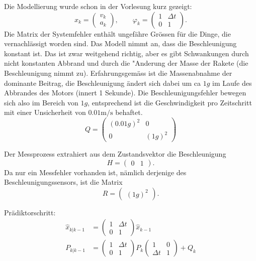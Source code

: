 \begin{loesung}
\begin{teilaufgaben}
\item Die Modellierung wurde schon in der Vorlesung kurz gezeigt:
\[
x_k=\begin{pmatrix}v_k\\a_k\end{pmatrix},\qquad
\varphi_k=\begin{pmatrix}1&\Delta t\\0&1\end{pmatrix}.
\]
Die Matrix der Systemfehler enthält ungefähre Grössen für die Dinge,
die vernachlässigt worden sind. Das Modell nimmt an, dass die
Beschleunigung konstant ist.
Das ist zwar weitgehend richtig, aber es gibt Schwankungen durch
nicht konstanten Abbrand und durch die "Anderung der Masse der
Rakete (die Beschleunigung nimmt zu). Erfahrungsgemäss ist die
Massenabnahme der dominante Beitrag, die Beschleunigung ändert sich
dabei um ca $1g$ im Laufe des Abbrandes des Motors (innert 1 Sekunde).
Die Beschleunigungsfehler bewegen sich also im Bereich von $1g$, entsprechend
ist die Geschwindigkeit pro Zeitschritt mit einer Unsicherheit von
$0.01\text{m/s}$ behaftet.
\[
Q=\begin{pmatrix}
(0.01g)^2&0\\
0&(1g)^2
\end{pmatrix}
\]
\item
Der Messprozess extrahiert aus dem Zustandsvektor die Beschleunigung
\[
H=\begin{pmatrix}0&1\end{pmatrix}.
\]
Da nur ein Messfehler vorhanden ist, nämlich derjenige des
Beschleunigungssensors, ist die Matrix
\[
R=\begin{pmatrix}
(1g)^2
\end{pmatrix}.
\]
\item Prädiktorschritt:
\begin{align*}
\hat x_{k|k-1}&=
\begin{pmatrix}1&\Delta t\\0&1\end{pmatrix}
\hat x_{k-1}
\\
P_{k|k-1}&=
\begin{pmatrix}1&\Delta t\\0&1\end{pmatrix}P_k
\begin{pmatrix}1&0\\\Delta t&1\end{pmatrix}
+
Q_k
\end{align*}

\end{teilaufgaben}
\end{loesung}
